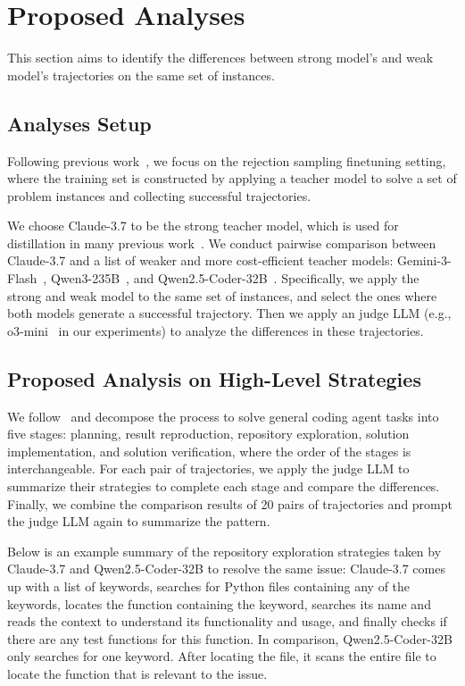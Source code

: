 \section{Proposed Analyses}
This section aims to identify the differences between strong model's and weak model's trajectories on the same set of instances.

\subsection{Analyses Setup}
Following previous work~\cite{swegym,R2EGym,swe-smith,swe-play,hybrid-gym}, we focus on the rejection sampling finetuning setting, where the training set is constructed by applying a teacher model to solve a set of problem instances and collecting successful trajectories. 

We choose Claude-3.7 to be the strong teacher model, which is used for distillation in many previous work~\cite{swegym,R2EGym,swe-smith,swe-play,hybrid-gym}.
We conduct pairwise comparison between Claude-3.7 and a list of weaker and more cost-efficient teacher models: Gemini-3-Flash~\cite{gemini3flash}, Qwen3-235B~\cite{qwen3}, and Qwen2.5-Coder-32B~\cite{qwen25coder}.
Specifically, we apply the strong and weak model to the same set of instances, and select the ones where both models generate a successful trajectory.
Then we apply an judge LLM (e.g., o3-mini~\cite{o3_mini} in our experiments) to analyze the differences in these trajectories.

\subsection{Proposed Analysis on High-Level Strategies}
We follow~\cite{hybrid-gym} and decompose the process to solve general coding agent tasks into five stages: planning, result reproduction, repository exploration, solution implementation, and solution verification, where the order of the stages is interchangeable.
For each pair of trajectories, we apply the judge LLM to summarize their strategies to complete each stage and compare the differences. 
Finally, we combine the comparison results of 20 pairs of trajectories and prompt the judge LLM again to summarize the pattern.

Below is an example summary of the repository exploration strategies taken by Claude-3.7 and Qwen2.5-Coder-32B to resolve the same issue:
Claude-3.7 comes up with a list of keywords, searches for Python files containing any of the keywords, locates the function containing the keyword, searches its name and reads the context to understand its functionality and usage, and finally checks if there are any test functions for this function.
In comparison, Qwen2.5-Coder-32B only searches for one keyword. After locating the file, it scans the entire file to locate the function that is relevant to the issue.

